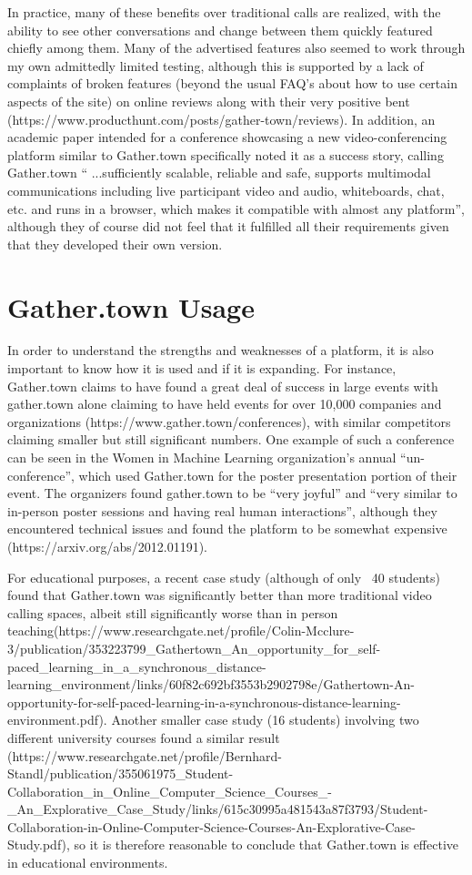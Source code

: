 \documentclass[bsc,frontabs,singlespacing,parskip,deptreport]{infthesis}
\begin{document}
In practice, many of these benefits over traditional calls are realized, with the ability to see other conversations and change between them quickly featured chiefly among them.  Many of the advertised features also seemed to work through my own admittedly limited testing, although this is supported by a lack of complaints of broken features (beyond the usual FAQ’s about how to use certain aspects of the site) on online reviews along with their very positive bent (https://www.producthunt.com/posts/gather-town/reviews). In addition, an academic paper intended for a conference showcasing a new video-conferencing platform similar to Gather.town specifically noted it as a success story, calling Gather.town “ ...sufficiently scalable, reliable and safe, supports multimodal communications including live participant video and audio, whiteboards, chat, etc. and runs in a browser, which makes it compatible with almost any platform”, although they of course did not feel that it fulfilled all their requirements given that they developed their own version.

\section{Gather.town Usage}

In order to understand the strengths and weaknesses of a platform, it is also important to know how it is used and if it is expanding.  For instance, Gather.town claims to have found a great deal of success in large events with gather.town alone claiming to have held events for over 10,000 companies and organizations (https://www.gather.town/conferences), with similar competitors claiming smaller but still significant numbers.  One example of such a conference can be seen in the Women in Machine Learning organization’s annual “un-conference”, which used Gather.town for the poster presentation portion of their event. The organizers found gather.town to be “very joyful” and “very similar to in-person poster sessions and having real human interactions”, although they encountered technical issues and found the platform to be somewhat expensive (https://arxiv.org/abs/2012.01191).

For educational purposes, a recent case study (although of only ~40 students) found that Gather.town was significantly better than more traditional video calling spaces, albeit still significantly worse than in person teaching(https://www.researchgate.net/profile/Colin-Mcclure-3/publication/353223799_Gathertown_An_opportunity_for_self-paced_learning_in_a_synchronous_distance-learning_environment/links/60f82c692bf3553b2902798e/Gathertown-An-opportunity-for-self-paced-learning-in-a-synchronous-distance-learning-environment.pdf).  Another smaller case study (16 students) involving two different university courses found a similar result (https://www.researchgate.net/profile/Bernhard-Standl/publication/355061975_Student-Collaboration_in_Online_Computer_Science_Courses_-_An_Explorative_Case_Study/links/615c30995a481543a87f3793/Student-Collaboration-in-Online-Computer-Science-Courses-An-Explorative-Case-Study.pdf), so it is therefore reasonable to conclude that Gather.town is effective in educational environments.
\end{document}
